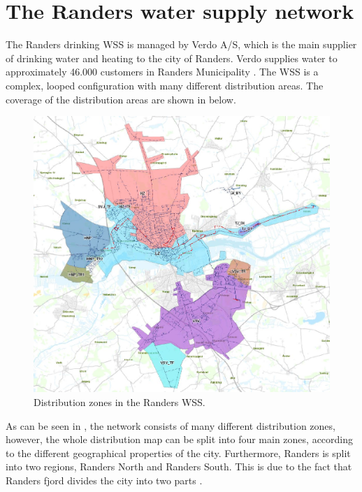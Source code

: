\newpage

\section{The Randers water supply network}
\label{the_randers_water_supply_network}

The Randers drinking WSS is managed by Verdo A/S, which is the main supplier of drinking water and heating to the city of Randers. Verdo supplies water to approximately 46.000 customers in Randers Municipality \cite{verdo}. The WSS is a complex, looped configuration with many different distribution areas. The coverage of the distribution areas are shown in  below.

\begin{figure}[H]
\centering
\includegraphics[width=1\textwidth]{report/pictures/level_zones}
\caption{Distribution zones in the Randers WSS.}
\label{fig:level_zones}
\end{figure}

As can be seen in , the network consists of many different distribution zones, however, the whole distribution map can be split into four main zones, according to the different geographical properties of the city. Furthermore, Randers is split into two regions, Randers North and Randers South. This is due to the fact that Randers fjord divides the city into two parts\cite{verdo} . 

